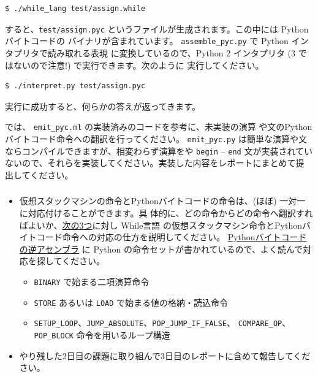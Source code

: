 \documentclass[a4paper,11pt]{jsarticle}
\begin{document}
\begin{lstlisting}
$ ./while_lang test/assign.while
\end{lstlisting}

すると、\verb|test/assign.pyc| というファイルが生成されます。この中には Pythonバイトコードの
バイナリが含まれています。 \verb|assemble_pyc.py| で Python インタプリタで読み取れる表現
に変換しているので、Python 2 インタプリタ (3 ではないので注意!) で実行できます。次のように
実行してください。

\begin{lstlisting}
$ ./interpret.py test/assign.pyc
\end{lstlisting}

実行に成功すると、何らかの答えが返ってきます。

では、 \verb|emit_pyc.ml| の実装済みのコードを参考に、未実装の演算
や文のPythonバイトコード命令への翻訳を行ってください。
\verb|emit_pyc.py| は簡単な演算や文ならコンパイルできますが、相変わらず演算をや \verb|begin| --
\verb|end| 文が実装されていないので、それらを実装してください。実装した内容をレポートにまとめて提
出してください。

\subsubsection{}

\begin{itemize}
\item 仮想スタックマシンの命令とPythonバイトコードの命令は、(ほぼ) 一対一に対応付けることができます。具
  体的に、どの命令からどの命令へ翻訳すればよいか、\underline{次の3つ}に対し While言語
  の仮想スタックマシン命令とPythonバイトコード命令への対応の仕方を説明してください。
  \href{https://docs.python.org/ja/2.7/library/dis.html}{Pythonバイトコードの逆アセンブラ}
  に Python の命令セットが書かれているので、よく読んで対応を探してください。
  \begin{itemize}
  \item \verb|BINARY| で始まる二項演算命令
  \item \verb|STORE| あるいは \verb|LOAD| で始まる値の格納・読込命令
  \item \verb|SETUP_LOOP|、\verb|JUMP_ABSOLUTE|、\verb|POP_JUMP_IF_FALSE|、
    \verb|COMPARE_OP|、\verb|POP_BLOCK| 命令を用いるループ構造
  \end{itemize}
\item やり残した2日目の課題に取り組んで3日目のレポートに含めて報告してください。
\end{itemize}
\end{document}
